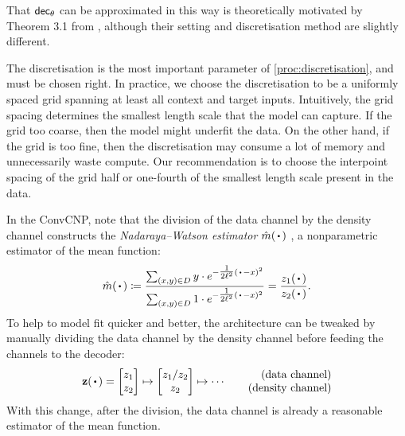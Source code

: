 \documentclass[12pt]{report}
\begin{document}
That $\mathsf{dec}_\theta$ can be approximated in this way is theoretically motivated by Theorem 3.1 from \textcite{Yarotsky:2022:Universal_Approximations_of_Invariant_Maps}, although their setting and discretisation method are slightly different.

The discretisation is the most important parameter of \cref{proc:discretisation}, and must be chosen right.
In practice, we choose the discretisation to be a uniformly spaced grid spanning at least all context and target inputs.
Intuitively, the grid spacing determines the smallest length scale that the model can capture.
If the grid too coarse, then the model might underfit the data.
On the other hand, if the grid is too fine, then the discretisation may consume a lot of memory and unnecessarily waste compute.
Our recommendation is to choose the interpoint spacing of the grid half or one-fourth of the smallest length scale present in the data.

In the ConvCNP, note that the division of the data channel by the density channel constructs the \emph{Nadaraya--Watson estimator} $\hat m(\vardot)$ \parencite{Nadaraya:1964:On_Estimating_Regression,Watson:1964:Smooth_Regression_Analysis}, a nonparametric estimator of the mean function:
\begin{equation}
    \hat m(\vardot)
    \coloneqq \frac
        {
            \sum_{(x, y) \in D}
            y \cdot e^{-\tfrac1{2\ell^2}(\vardot - x)^2} 
        }
        {
            \sum_{(x, y) \in D}
            1 \cdot e^{-\tfrac1{2\ell^2}(\vardot - x)^2} 
        }
    = \frac{z_1(\vardot)}{z_2(\vardot)}.
\end{equation}
To help to model fit quicker and better, the architecture can be tweaked by manually dividing the data channel by the density channel before feeding the channels to the decoder:
\begin{equation}
    \vz(\vardot) = \begin{bmatrix}
        z_1 \\
        z_2 
    \end{bmatrix}
    \mapsto
    \begin{bmatrix}
        z_1 / z_2 \\
        z_2 
    \end{bmatrix}
    \mapsto
    \cdots
    \qquad
    \begin{matrix*}[r]
        \text{(data channel)} \\
        \text{(density channel)}
    \end{matrix*}
\end{equation}
With this change, after the division, the data channel is already a reasonable estimator of the mean function.
\end{document}
